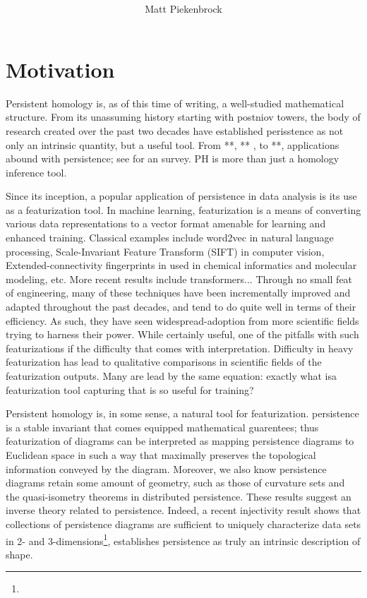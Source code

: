 \documentclass[10pt]{article}
\title{\vspace{-2.0em} \vspace{-0.5em}}
\author{Matt Piekenbrock}
\date{}
\begin{document}
\noindent



\section{Motivation}
Persistent homology is, as of this time of writing, a well-studied mathematical structure. From its unassuming history starting with postniov towers, the body of research created over the past two decades have established perisstence as not only an intrinsic quantity, but a useful tool. 
From **, ** , to **, applications abound with persistence; see for an survey. PH is more than just a homology inference tool.  

Since its inception, a popular application of persistence in data analysis is its use as a featurization tool. 
In machine learning, featurization is a means of converting various data representations to a vector format amenable for learning and enhanced training. Classical examples include word2vec in natural language processing, Scale-Invariant Feature Transform (SIFT) in computer vision, Extended-connectivity fingerprints in used in chemical informatics and molecular modeling, etc. 
More recent results include transformers... 
Through no small feat of engineering, many of these techniques have been incrementally improved and adapted throughout the past decades, and tend to do quite well in terms of their efficiency. As such, they have seen widespread-adoption from more scientific fields trying to harness their power. 
While certainly useful, one of the pitfalls with such featurizations if the difficulty that comes with interpretation. 
Difficulty in heavy featurization has lead to qualitative comparisons in scientific fields of the featurization outputs. Many are lead by the same equation: exactly what isa featurization tool capturing that is so useful for training?

Persistent homology is, in some sense, a natural tool for featurization. persistence is a stable invariant that comes equipped mathematical guarentees; thus featurization of diagrams can be interpreted as mapping persistence diagrams to Euclidean space in such a way that maximally preserves the topological information conveyed by the diagram. 
Moreover, we also know persistence diagrams retain some amount of geometry, such as those of curvature sets and the quasi-isometry theorems in distributed persistence. These results suggest an inverse theory related to persistence. 
Indeed, a recent injectivity result shows that collections of persistence diagrams are sufficient to uniquely characterize data sets in 2- and 3-dimensions\footnote{}, establishes persistence as truly an intrinsic description of shape. 
\end{document}
